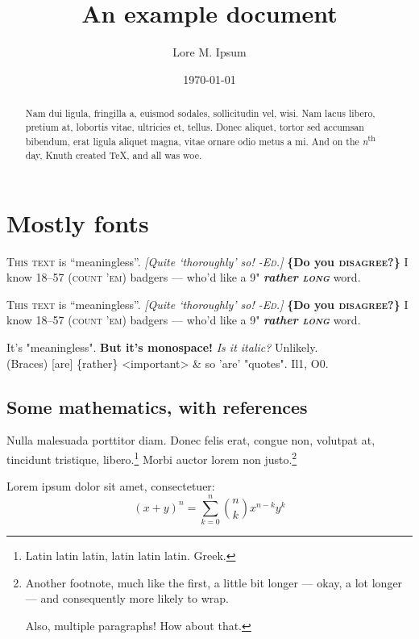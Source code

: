 \documentclass{rntz}
\title{An example document}
\author{Lore M. Ipsum}
\date{\today}
\begin{document}
\maketitle

\begin{abstract}
  Nam dui ligula, fringilla a, euismod sodales, sollicitudin vel, wisi. Nam
  lacus libero, pretium at, lobortis vitae, ultricies et, tellus. Donec aliquet,
  tortor sed accumsan bibendum, erat ligula aliquet magna, vitae ornare odio
  metus a mi. And on the \emph{n}\textsuperscript{th} day, Knuth created \TeX,
  and all was woe.
\end{abstract}

\section{Mostly fonts}\label{sec:one}

\newcommand{\testtext}{\textsc{This text} is ``meaningless''. \emph{[Quite
      `thoroughly' so! \textsc{-Ed.}]} {\bfseries \{Do you \textsc{disagree}?\}} I
  know 18--57 (\textsc{count 'em}) badgers --- who'd like a 9"
  {\bfseries\itshape rather \textsc{long}} word.}

\begingroup
\testtext\setlength\parskip{1em}\setlength\parindent{0em}

{\sffamily\testtext}

{\ttfamily It's "meaningless". \textbf{But it's monospace!}
  {\itshape
    Is it italic?} Unlikely.\\
  (Braces) [are] \{rather\} <important> \& so 'are' "quotes".
  Il1, O0.}
\endgroup

\subsection{Some mathematics, with references}

Nulla malesuada porttitor diam. Donec felis erat, congue non, volutpat at,
tincidunt tristique, libero.\footnote{Latin latin latin, latin latin latin.
  Greek.} Morbi auctor lorem non justo.\footnote{Another footnote, much like the
  first, a little bit longer --- okay, a lot longer --- and consequently more
  likely to wrap.\par Also, multiple paragraphs! How about that.}

\begin{theorem}[Binomial]\label{thm:binomial} Lorem ipsum dolor sit amet, consectetuer:
  \[ (x+y)^n = \sum_{k=0}^n \binom{n}{k} x^{n-k} y^k \]
\end{theorem}
\end{document}
